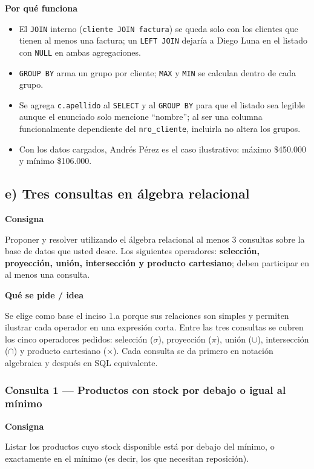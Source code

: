 \documentclass[11pt,a4paper]{article}
\newcommand{\itemcabecera}[1]{\noindent\textbf{#1}\par\medskip}
\newcommand{\bloqueConsigna}{\itemcabecera{Consigna}}
\newcommand{\bloqueIdea}{\itemcabecera{Qu\'e se pide / idea}}
\newcommand{\bloquePorque}{\itemcabecera{Por qu\'e funciona}}
\begin{document}
\bloquePorque

\begin{itemize}
    \item El \texttt{JOIN} interno (\texttt{cliente JOIN factura}) se queda solo con los clientes que tienen al menos una factura; un \texttt{LEFT JOIN} dejaría a Diego Luna en el listado con \texttt{NULL} en ambas agregaciones.
    \item \texttt{GROUP BY} arma un grupo por cliente; \texttt{MAX} y \texttt{MIN} se calculan dentro de cada grupo.
    \item Se agrega \texttt{c.apellido} al \texttt{SELECT} y al \texttt{GROUP BY} para que el listado sea legible aunque el enunciado solo mencione ``nombre''; al ser una columna funcionalmente dependiente del \texttt{nro\_cliente}, incluirla no altera los grupos.
    \item Con los datos cargados, Andrés Pérez es el caso ilustrativo: máximo \$450.000 y mínimo \$106.000.
\end{itemize}

\subsection{e) Tres consultas en álgebra relacional}

\bloqueConsigna

Proponer y resolver utilizando el álgebra relacional al menos 3 consultas sobre la base de datos que usted desee. Los siguientes operadores: \textbf{selección, proyección, unión, intersección y producto cartesiano}; deben participar en al menos una consulta.

\bloqueIdea

Se elige como base el inciso 1.a porque sus relaciones son simples y permiten ilustrar cada operador en una expresión corta. Entre las tres consultas se cubren los cinco operadores pedidos: selección ($\sigma$), proyección ($\pi$), unión ($\cup$), intersección ($\cap$) y producto cartesiano ($\times$). Cada consulta se da primero en notación algebraica y después en SQL equivalente.

\subsubsection*{Consulta 1 --- Productos con stock por debajo o igual al mínimo}

\bloqueConsigna

Listar los productos cuyo stock disponible está por debajo del mínimo, o exactamente en el mínimo (es decir, los que necesitan reposición).
\end{document}
